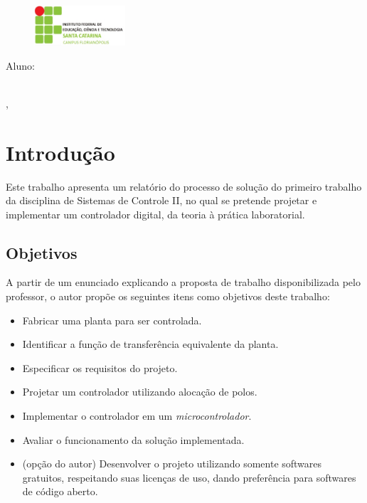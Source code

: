 \documentclass[
	12pt,				%
	article,			%
	openright,			%
	oneside,
	a4paper,			%
	chapter=TITLE,		%
	section=TITLE,		%
	english,			%
	french,				%
	spanish,			%
	brazil,				%
]{abntex2}
\renewcommand{\imprimircapa}{
	\begin{capa}
		\SingleSpacing
		\begin{adjustwidth}{}{}			
			\begin{minipage}{1\textwidth}
				\begin{figure}
					\vspace*{-1em}\includegraphics[height=4em]{logotipo_ifsc.jpg}
				\end{figure}
				\imprimirinstituicao 
			\end{minipage}
			\vfill
			\begin{center}\ABNTEXchapterfont\LARGE\imprimirtitulo
				\vfill
				\small
				\begin{center}
					Aluno: \imprimirautor\\[1em]
					\imprimirorientadorRotulo\imprimirorientador\\
					\imprimircoorientadorRotulo\imprimircoorientador
				\end{center}
				\vfill
				\imprimirlocal, \imprimirdata
			\end{center}	
		\end{adjustwidth}
	\end{capa}
}
\begin{document}
	
	
	\frenchspacing 
	
	
	\imprimircapa
	
	\tableofcontents*
	
	\clearpage
	\listoffigures
	\vspace{34pt}
	\listoftables
	
	\textual
	
	\pagebreak
	
	\chapter*[Introdução]{Introdução}
	
    Este trabalho apresenta um relatório do processo de solução do primeiro trabalho da disciplina de Sistemas de Controle II, no qual se pretende projetar e implementar um controlador digital, da teoria à prática laboratorial.
	
	\section[Objetivos]{Objetivos}
	
	A partir de um enunciado explicando a proposta de trabalho disponibilizada pelo professor, o autor propõe os seguintes itens como objetivos deste trabalho:
	
	\begin{itemize}
	    \item Fabricar uma planta para ser controlada.
	    \item Identificar a função de transferência equivalente da planta.
	    \item Especificar os requisitos do projeto.
	    \item Projetar um controlador utilizando alocação de polos.
	    \item Implementar o controlador em um \textit{microcontrolador}.
	    \item Avaliar o funcionamento da solução implementada.
		\item (opção do autor) Desenvolver o projeto utilizando somente softwares gratuitos, respeitando suas licenças de uso, dando preferência para softwares de código aberto.
	\end{itemize}
	
\end{document}
